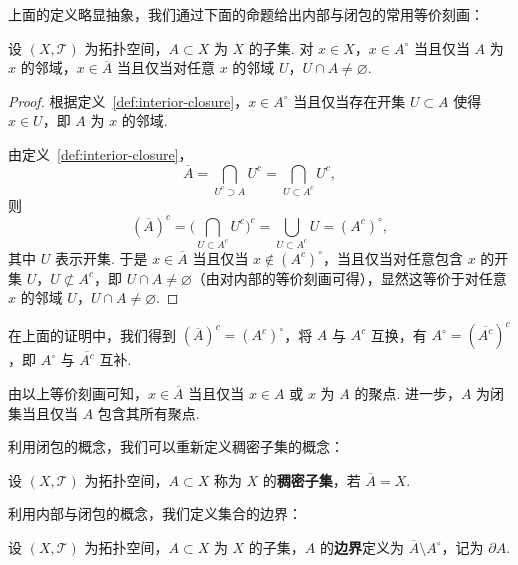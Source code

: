 \documentclass[../main.tex]{subfiles}
\begin{document}
上面的定义略显抽象，我们通过下面的命题给出内部与闭包的常用等价刻画：

\begin{proposition}[集合的内部与闭包的等价刻画] \label{prop:interior-closure-nbh}
    设 $(X, \mathcal{T})$ 为拓扑空间，$A \subset X$ 为 $X$ 的子集. 对 $x \in X$，$x \in A^\circ$ 当且仅当 $A$ 为 $x$ 的邻域，$x \in \overline{A}$ 当且仅当对任意 $x$ 的邻域 $U$，$U \cap A \neq \varnothing$. 
\end{proposition}

\begin{proof}
    根据定义~\ref{def:interior-closure}，$x \in A^\circ$ 当且仅当存在开集 $U \subset A$ 使得 $x \in U$，即 $A$ 为 $x$ 的邻域. 

    由定义~\ref{def:interior-closure}，
    $$
    \overline{A} = \bigcap\limits_{U^c \supset A} U^c = \bigcap\limits_{U \subset A^c} U^c, 
    $$
    则 
    $$
    (\overline{A})^c = \big( \bigcap\limits_{U \subset A^c} U^c \big)^c = \bigcup\limits_{U \subset A^c} U = (A^c)^\circ, 
    $$
    其中 $U$ 表示开集. 于是 $x \in \overline{A}$ 当且仅当 $x \notin (A^c)^\circ$，当且仅当对任意包含 $x$ 的开集 $U$，$U \not\subset A^c$，即 $U \cap A \neq \varnothing$（由对内部的等价刻画可得），显然这等价于对任意 $x$ 的邻域 $U$，$U \cap A \neq \varnothing$. 
\end{proof}

\begin{remark} \label{rem:1.5.7}
    在上面的证明中，我们得到 $(\overline{A})^c = (A^c)^\circ$，将 $A$ 与 $A^c$ 互换，有 $A^\circ = (\overline{A^c})^c$，即 $A^\circ$ 与 $\overline{A^c}$ 互补. 

    由以上等价刻画可知，$x \in \overline{A}$ 当且仅当 $x \in A$ 或 $x$ 为 $A$ 的聚点. 进一步，$A$ 为闭集当且仅当 $A$ 包含其所有聚点. 
\end{remark}

利用闭包的概念，我们可以重新定义稠密子集的概念：

\begin{definition}[稠密子集的拓扑定义]
    设 $(X, \mathcal{T})$ 为拓扑空间，$A \subset X$ 称为 $X$ 的\textbf{稠密子集}，若 $\overline{A} = X$. 
\end{definition}

利用内部与闭包的概念，我们定义集合的边界：

\begin{definition}
    设 $(X, \mathcal{T})$ 为拓扑空间，$A \subset X$ 为 $X$ 的子集，$A$ 的\textbf{边界}定义为 $\overline{A} \setminus A^\circ$，记为 $\partial A$. 
\end{definition}
\end{document}
